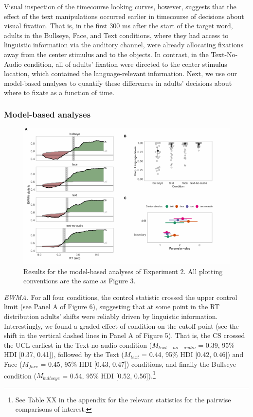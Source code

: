 \documentclass[english,floatsintext,man]{apa6}
\begin{document}
Visual inspection of the timecourse looking curves, however, suggests
that the effect of the text manipulations occurred earlier in timecourse
of decisions about visual fixation. That is, in the first 300 ms after
the start of the target word, adults in the Bullseye, Face, and Text
conditions, where they had access to linguistic information via the
auditory channel, were already allocating fixations away from the center
stimulus and to the objects. In contrast, in the Text-No-Audio
condition, all of adults' fixation were directed to the center stimulus
location, which contained the language-relevant information. Next, we
use our model-based analyses to quantify these differences in adults'
decisions about where to fixate as a function of time.

\hypertarget{model-based-analyses-1}{%
\subsubsection{Model-based analyses}\label{model-based-analyses-1}}

\begin{figure}[!t]

{\centering \includegraphics[width=0.9\linewidth]{figs/text-model-plots-1} 

}

\caption{Results for the model-based analyses of Experiment 2. All plotting conventions are the same as Figure 3.}\label{fig:text-model-plots}
\end{figure}

\emph{EWMA.} For all four conditions, the control statistic crossed the
upper control limit (see Panel A of Figure 6), suggesting that at some
point in the RT distribution adults' shifts were reliably driven by
linguistic information. Interestingly, we found a graded effect of
condition on the cutoff point (see the shift in the vertical dashed
lines in Panel A of Figure 5). That is, the CS crossed the UCL earliest
in the Text-no-audio condition (\(M_{text-no-audio}\) = 0.39, 95\% HDI
{[}0.37, 0.41{]}), followed by the Text (\(M_{text}\) = 0.44, 95\% HDI
{[}0.42, 0.46{]}) and Face (\(M_{face}\) = 0.45, 95\% HDI {[}0.43,
0.47{]}) conditions, and finally the Bullseye condition
(\(M_{bullseye}\) = 0.54, 95\% HDI {[}0.52, 0.56{]}).\footnote{See Table
  XX in the appendix for the relevant statistics for the pairwise
  comparisons of interest.}
\end{document}

